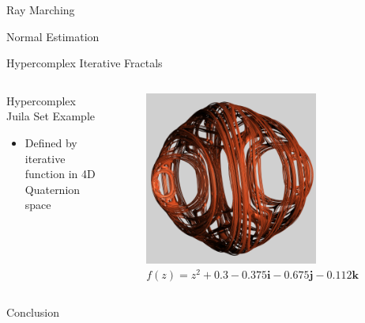 \documentclass[aspectratio=169,t]{beamer}
\begin{document}
\begin{frame}[label={sec:orgc3ff9d4}]{Ray Marching}
\end{frame}

\begin{frame}[label={sec:orgd5f0cec}]{Normal Estimation}
\end{frame}

\begin{frame}[label={sec:org52a37c3}]{Hypercomplex Iterative Fractals}
\begin{columns}
\begin{column}{0.55\columnwidth}
\begin{block}{Hypercomplex Juila Set Example}
\begin{itemize}
\item Defined by iterative function in 4D Quaternion space
\end{itemize}
\end{block}
\end{column}

\begin{column}{0.45\columnwidth}
\begin{figure}[htbp]
\centering
\includegraphics[width=0.75\textwidth]{./Figs/Fig_1v2.png}
\caption{\(f(z) = z^2 + 0.3 - 0.375\symbf{i} - 0.675\symbf{j} - 0.112\symbf{k}\)}
\end{figure}
\end{column}
\end{columns}
\end{frame}

\begin{frame}[label={sec:org281ddd0}]{Conclusion}
\end{frame}
\end{document}
